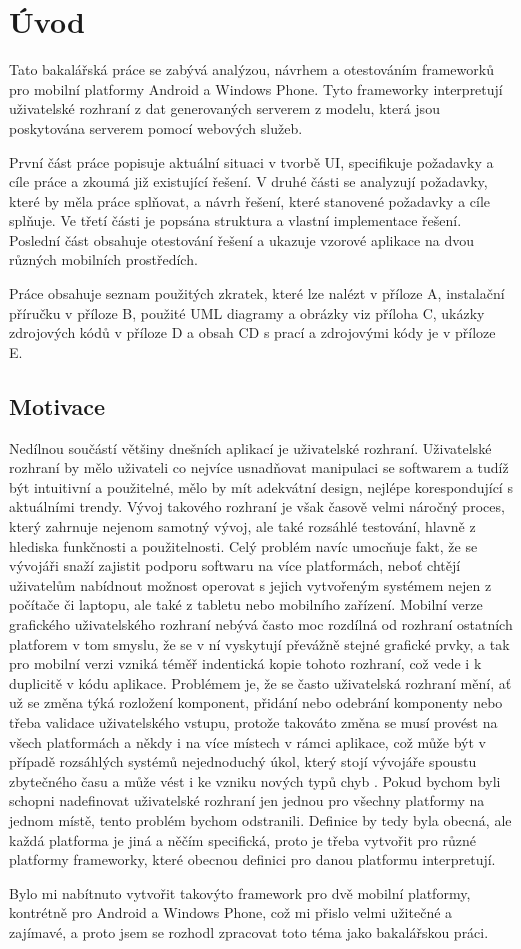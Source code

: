 \chapter{Úvod}
Tato bakalářská práce se zabývá analýzou, návrhem a otestováním frameworků pro mobilní platformy Android a Windows Phone. Tyto frameworky interpretují uživatelské rozhraní z dat generovaných serverem z modelu, která jsou poskytována serverem pomocí webových služeb.

První část práce popisuje aktuální situaci v tvorbě UI, specifikuje požadavky a cíle práce a zkoumá již existující řešení. V druhé části se analyzují požadavky, které by měla práce splňovat, a návrh řešení, které stanovené požadavky a cíle splňuje. Ve třetí části je popsána struktura a vlastní implementace řešení. Poslední část obsahuje otestování řešení a ukazuje vzorové aplikace na dvou různých mobilních prostředích.

Práce obsahuje seznam použitých zkratek, které lze nalézt v příloze A, instalační příručku v příloze B, použité UML diagramy a obrázky viz příloha C, ukázky zdrojových kódů v příloze D a obsah CD s prací a zdrojovými kódy je v příloze E.
 
\section{Motivace}
Nedílnou součástí většiny dnešních aplikací je uživatelské rozhraní. Uživatelské rozhraní by mělo uživateli co nejvíce usnadňovat manipulaci se softwarem a tudíž být intuitivní a použitelné, mělo by mít adekvátní design, nejlépe korespondující s aktuálními trendy. Vývoj takového rozhraní je však časově velmi náročný proces, který zahrnuje nejenom samotný vývoj, ale také rozsáhlé testování, hlavně z hlediska funkčnosti a použitelnosti. Celý problém navíc umocňuje fakt, že se vývojáři snaží zajistit podporu softwaru na více platformách, neboť chtějí uživatelům nabídnout možnost operovat s jejich vytvořeným systémem nejen z počítače či laptopu, ale také z tabletu nebo mobilního zařízení. Mobilní verze grafického uživatelského rozhraní nebývá často moc rozdílná od rozhraní ostatních platforem v tom smyslu, že se v ní vyskytují převážně stejné grafické prvky, a tak pro mobilní verzi vzniká téměř indentická kopie tohoto rozhraní, což vede i k duplicitě v kódu aplikace. Problémem je, že se často uživatelská rozhraní mění, ať už se změna týká rozložení komponent, přidání nebo odebrání komponenty nebo třeba validace uživatelského vstupu, protože takováto změna se musí provést na všech platformách a někdy i na více místech v rámci aplikace, což může být v případě rozsáhlých systémů nejednoduchý úkol, který stojí vývojáře spoustu zbytečného času a může vést i ke vzniku nových typů chyb \cite{towards-smart-design}. Pokud bychom byli schopni nadefinovat uživatelské rozhraní jen jednou pro všechny platformy na jednom místě, tento problém bychom odstranili. Definice by tedy byla obecná, ale každá platforma je jiná a něčím specifická, proto je třeba vytvořit pro různé platformy frameworky, které obecnou definici pro danou platformu interpretují. 

Bylo mi nabítnuto vytvořit takovýto framework pro dvě mobilní platformy, kontrétně pro Android a Windows Phone, což mi přislo velmi užitečné a zajímavé, a proto jsem se rozhodl zpracovat toto téma jako bakalářskou práci.
